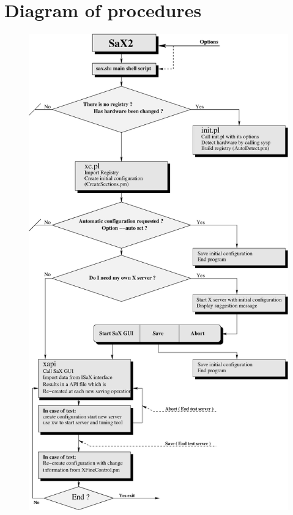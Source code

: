 \section{Diagram of procedures}
\begin{figure}[h]
\centering
\includegraphics[scale=0.45]{figures/cheme.eps}
\end{figure}


